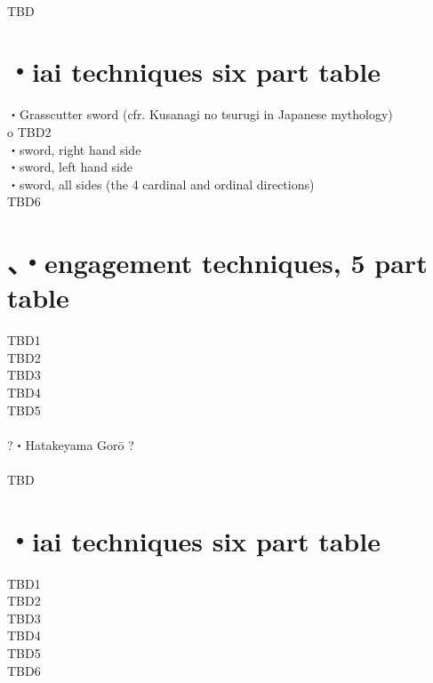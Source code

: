 \documentclass[dvipdfmx, a4paper, 12pt]{utarticle}
\begin{document}
\begin{CJK*}{UTF8}{min}
\begin{landscape}
\setcounter{section}{0}
\newpage
\pagestyle{empty}
\\
TBD
\section{・iai techniques six part table}
\noindent {}・Grasscutter sword (cfr. Kusanagi no tsurugi in Japanese mythology)\\
o
TBD2\\
・sword, right hand side\\
・sword, left hand side\\
・sword, all sides (the 4 cardinal and ordinal directions)\\
TBD6\\
\section{、・engagement techniques, 5 part table}
\noindent TBD1\\
TBD2\\
TBD3\\
TBD4\\
TBD5\\
\\
?・Hatakeyama Gor\={o} ?\\

\setcounter{section}{0}
\newpage
\pagestyle{empty}
\\
TBD
\section{・iai techniques six part table}
\noindent TBD1\\
TBD2\\
TBD3\\
TBD4\\
TBD5\\
TBD6\\

\end{landscape}
\end{CJK*}
\end{document}
